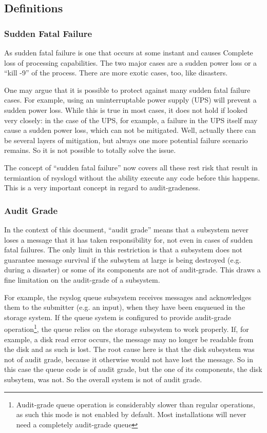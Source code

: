 \documentclass[a4paper,10pt]{article}
\begin{document}
\subsection{Definitions}
\subsubsection{Sudden Fatal Failure}
As sudden fatal failure is one that occurs at some instant and causes Complete loss of processing capabilities. The two major cases are a sudden power loss or a ``kill -9'' of the process. There are more exotic cases, too, like disasters.

One may argue that it is possible to protect against many sudden fatal failure cases. For example, using an uninterruptable power supply (UPS) will prevent a sudden power loss. While this is true in most cases, it does not hold if looked very closely: in the case of the UPS, for example, a failure in the UPS itself may cause a sudden power loss, which can not be mitigated. Well, actually there can be several layers of mitigation, but always one more potential failure scenario remains. So it is not possible to totally solve the issue.

The concept of ``sudden fatal failure'' now covers all these rest risk that result in termiantion of rsyslogd without the ability execute any code before this happens. This is a very important concept in regard to audit-gradeness.

\subsubsection{Audit Grade}
In the context of this document, ``audit grade'' means that a subsystem never loses a message that it has taken responsibility for, not even in cases of sudden fatal failures. The only limit in this restriction is that a subsystem does not guarantee message survival if the subsytem at large is being destroyed (e.g. during a disaster) or some of its components are not of audit-grade. This draws a fine limitation on the audit-grade of a subsystem.

For example, the rsyslog queue subsystem receives messages and acknowledges them to the submitter (e.g. an input), when they have been enqueued in the storage system. If the queue system is configured to provide audit-grade operation\footnote{Audit-grade queue operation is considerably slower than regular operations, as such this mode is not enabled by default. Most installations will never need a completely audit-grade queue}, the queue relies on the storage subsystem to work properly. If, for example, a disk read error occurs, the message may no longer be readable from the disk and as such is lost. The root cause here is that the disk subsystem was not of audit grade, because it otherwise would not have lost the message. So in this case the queue code is of audit grade, but the one of its components, the disk subsytem, was not. So the overall system is not of audit grade.
\end{document}
